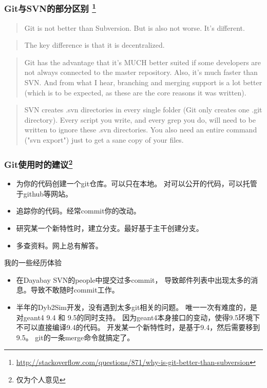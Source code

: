 \begin{frame}
    \frametitle{Git与SVN的部分区别
        \footnote{\scriptsize \url{http://stackoverflow.com/questions/871/why-is-git-better-than-subversion}}}
        \begin{quote}
            Git is not better than Subversion. But is also not worse. It's
            different.
        \end{quote}

        \begin{quote}
            The key difference is that it is decentralized.
        \end{quote}

        \begin{quote}
            Git has the advantage that it's MUCH better suited if some
            developers are not always connected to the master repository. Also,
            it's much faster than SVN. And from what I hear, branching and
            merging support is a lot better (which is to be expected, as these
            are the core reasons it was written).
        \end{quote}

        \begin{quote}
            SVN creates .svn directories in every single folder (Git only
            creates one .git directory). Every script you write, and every grep
            you do, will need to be written to ignore these .svn directories.
            You also need an entire command ("svn export") just to get a sane
            copy of your files.
        \end{quote}
\end{frame}

\begin{frame}
    \frametitle{Git使用时的建议\footnote{\scriptsize 仅为个人意见}}
    \begin{itemize}
        \item 为你的代码创建一个git仓库。可以只在本地。
              对可以公开的代码，可以托管于github等网站。
        \item 追踪你的代码。经常commit你的改动。
        \item 研究某一个新特性时，建立分支。最好基于主干创建分支。
        \item 多查资料。网上总有解答。
    \end{itemize}
    \begin{block}{我的一些经历体验}
        \begin{itemize}
            \item 在Dayabay SVN的people中提交过多commit，
                  导致邮件列表中出现太多的消息。导致不敢随时commit工作。
            \item 半年的Dyb2Sim开发，没有遇到太多git相关的问题。
                  唯一一次有难度的，是对geant4 9.4 和 9.5的同时支持。
                  因为geant4本身接口的变动，使得9.5环境下不可以直接编译9.4的代码。
                  开发某一个新特性时，是基于9.4，然后需要移到9.5。
                  git的一条merge命令就搞定了。
        \end{itemize}
    \end{block}
\end{frame}
